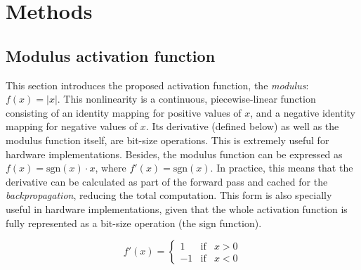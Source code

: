 



\section{Methods} \label{sec:modulus_methods}
\subsection{Modulus activation function}
This section introduces the proposed activation function, the \textit{modulus}: $f(x)=|x|$. This nonlinearity is a continuous, piecewise-linear function consisting of an identity mapping for positive values of $x$, and a negative identity mapping for negative values of $x$. Its derivative (defined below) as well as the modulus function itself, are bit-size operations. This is extremely useful for hardware implementations. Besides, the modulus function can be expressed as $f(x) = \text{sgn}(x)\cdot x$, where $f'(x) = \text{sgn}(x)$. In practice, this means that the derivative can be calculated as part of the forward pass and cached for the \textit{backpropagation}, reducing the total computation. This form is also specially useful in hardware implementations, given that the whole activation function is fully represented as a bit-size operation (the sign function).

$$
f'(x)= \left\{ \begin{array}{lcc}
1 &   \text{if}  & x > 0 \\
-1 &  \text{if} & x < 0
\end{array} \right.
$$

